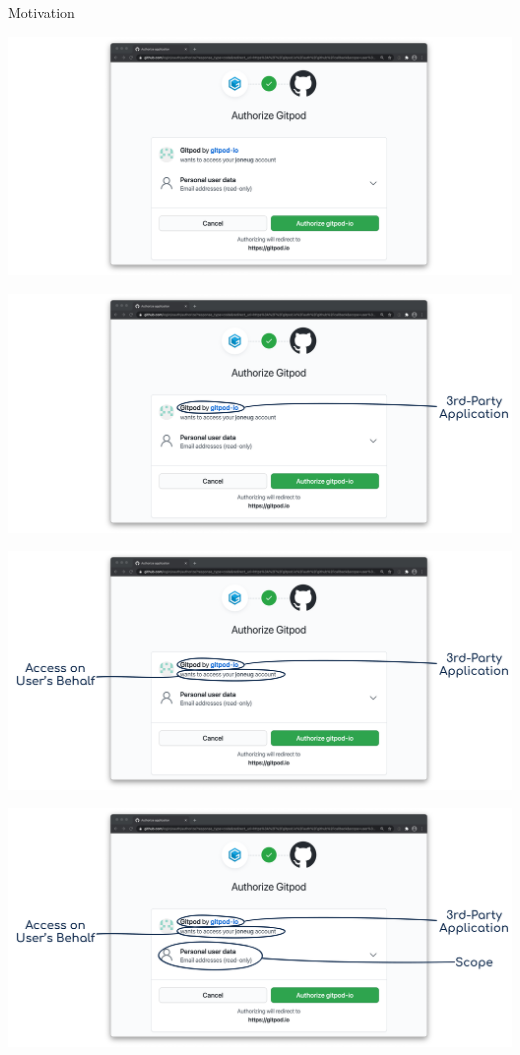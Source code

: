 \documentclass[aspectratio=169]{beamer}
\begin{document}
\begin{frame}{Motivation}
	\begin{overprint}
		\centerline{\includegraphics[height=0.85\textheight]{figures/motivation-01}}
		\centerline{\includegraphics[height=0.85\textheight]{figures/motivation-02}}
		\centerline{\includegraphics[height=0.85\textheight]{figures/motivation-03}}
		\centerline{\includegraphics[height=0.85\textheight]{figures/motivation-04}}
	\end{overprint}
\end{frame}
\end{document}
